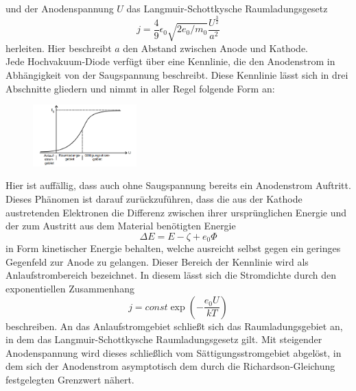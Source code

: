 und der Anodenspannung $U$ das Langmuir-Schottkysche Raumladungsgesetz 
\begin{equation}
j=\frac{4}{9}\epsilon_0\sqrt{2e_0/m_0}\frac{U^{\frac{3}{2}}}{a^2}
\end{equation}
herleiten. Hier beschreibt $a$ den Abstand zwischen Anode und Kathode. \\
Jede Hochvakuum-Diode verfügt über eine Kennlinie, die den Anodenstrom in Abhängigkeit von der Saugspannung beschreibt. Diese Kennlinie lässt 
sich in drei Abschnitte gliedern und nimmt in aller Regel folgende Form an:
\begin{figure}[h]
    \centering
    \includegraphics[width=4cm, keepaspectratio]{Kennlinie}
    \label{Drehimpuls}
  \end{figure}
Hier ist auffällig, dass auch ohne Saugspannung bereits ein Anodenstrom Auftritt. Dieses Phänomen ist darauf zurückzuführen, 
dass die aus der Kathode austretenden Elektronen die Differenz zwischen ihrer ursprünglichen Energie und der zum Austritt aus dem Material benötigten Energie
\begin{equation}
\Delta E=E-\zeta+e_0\Phi
\end{equation}
in Form kinetischer Energie behalten, welche ausreicht selbst gegen ein geringes Gegenfeld zur Anode zu gelangen. Dieser Bereich der Kennlinie wird als
Anlaufstrombereich bezeichnet. In diesem lässt sich die Stromdichte durch den exponentiellen Zusammenhang
\begin{equation}
j=const\exp(-\frac{e_0U}{kT})
\end{equation}
beschreiben. An das Anlaufstromgebiet schließt sich das Raumladungsgebiet an, in dem das Langmuir-Schottkysche Raumladungsgesetz gilt. Mit steigender
Anodenspannung wird dieses schließlich vom Sättigungsstromgebiet abgelöst, in dem sich der Anodenstrom asymptotisch dem durch die Richardson-Gleichung
festgelegten Grenzwert nähert.


